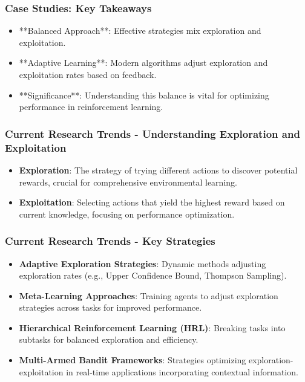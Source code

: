 \documentclass[aspectratio=169]{beamer}
\begin{document}
\begin{frame}[fragile]
    \frametitle{Case Studies: Key Takeaways}
    \begin{itemize}
        \item **Balanced Approach**: Effective strategies mix exploration and exploitation.
        \item **Adaptive Learning**: Modern algorithms adjust exploration and exploitation rates based on feedback.
        \item **Significance**: Understanding this balance is vital for optimizing performance in reinforcement learning.
    \end{itemize}
\end{frame}

\begin{frame}[fragile]
    \frametitle{Current Research Trends - Understanding Exploration and Exploitation}
    \begin{itemize}
        \item \textbf{Exploration}: The strategy of trying different actions to discover potential rewards, crucial for comprehensive environmental learning.
        \item \textbf{Exploitation}: Selecting actions that yield the highest reward based on current knowledge, focusing on performance optimization.
    \end{itemize}
\end{frame}

\begin{frame}[fragile]
    \frametitle{Current Research Trends - Key Strategies}
    \begin{itemize}
        \item \textbf{Adaptive Exploration Strategies}: Dynamic methods adjusting exploration rates (e.g., Upper Confidence Bound, Thompson Sampling).
        \item \textbf{Meta-Learning Approaches}: Training agents to adjust exploration strategies across tasks for improved performance.
        \item \textbf{Hierarchical Reinforcement Learning (HRL)}: Breaking tasks into subtasks for balanced exploration and efficiency.
        \item \textbf{Multi-Armed Bandit Frameworks}: Strategies optimizing exploration-exploitation in real-time applications incorporating contextual information.
    \end{itemize}
\end{frame}
\end{document}
